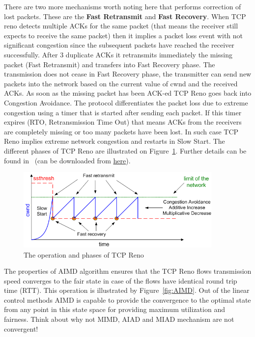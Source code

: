 \documentclass[a4paper]{article}
\begin{document}
There are two more mechanisms worth noting here that performs correction of lost packets. These are the \textbf{Fast
    Retransmit} and \textbf{Fast Recovery}. When TCP reno detects multiple ACKs for the same packet (that means the
receiver still expects to receive the same packet) then it implies a packet loss event with not significant congestion
since the subsequent packets have reached the receiver successfully. After 3 duplicate ACKs it retransmits immediately
the missing packet (Fast Retransmit) and transfers into Fast Recovery phase. The transmission does not cease in Fast
Recovery phase, the transmitter can send new packets into the network based on the current value of cwnd and the
received ACKs. As soon as the missing packet has been ACK-ed TCP Reno goes back into Congestion Avoidance. The protocol
differentiates the packet loss due to extreme congestion using a timer that is started after sending each packet. If
this timer expires (RTO, Retransmission Time Out) that means ACKs from the receivers are completely missing or too many
packets have been lost. In such case TCP Reno implies extreme network congestion and restarts in Slow Start. The
different phases of TCP Reno are illustrated on Figure~\ref{fig:TCP-Reno-operation}. Further details can be found
in~\cite{CongestionAvoidance} (can be downloaded from
\href{http://qosip.tmit.bme.hu/cgi-bin/twiki/viewfile/VITT5318/WebHome?rev=1;filename=jacobson88congestion.pdf}{here}).

\begin{figure}[H]
    \centering
    \includegraphics[width=0.9\textwidth]{figures/tcp-reno.png}
    \caption{The operation and phases of TCP Reno}
    \label{fig:TCP-Reno-operation}
\end{figure}

The properties of AIMD algorithm ensures that the TCP Reno flows transmission speed converges to the fair state in case
of the flows have identical round trip time (RTT). This operation is illustrated by Figure~\ref{fig:AIMD}. Out of the
linear control methods AIMD is capable to provide the convergence to the optimal state from any point in this state
space for providing maximum utilization and fairness. Think about why not MIMD, AIAD and MIAD mechanism are not
convergent!
\end{document}
